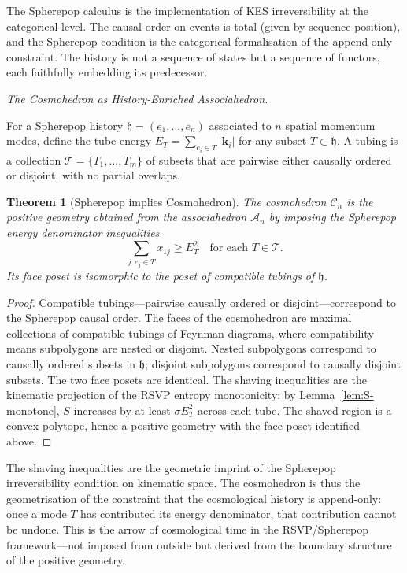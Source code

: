 \documentclass[11pt]{article}
\theoremstyle{plain}
\newtheorem{theorem}{Theorem}[section]
\theoremstyle{definition}
\theoremstyle{remark}
\newcommand{\Sf}{S}
\newcommand{\hist}{\mathfrak{h}}
\newcommand{\Assoc}{\mathcal{A}_n}
\newcommand{\Cosmo}{\mathcal{C}_n}
\begin{document}
The Spherepop calculus is the implementation of KES irreversibility at the categorical level. The causal order on events is total (given by sequence position), and the Spherepop condition is the categorical formalisation of the append-only constraint. The history is not a sequence of states but a sequence of functors, each faithfully embedding its predecessor.

\medskip\noindent\textit{The Cosmohedron as History-Enriched Associahedron.}

For a Spherepop history $\hist = (e_1, \ldots, e_n)$ associated to $n$ spatial momentum modes, define the tube energy $E_T = \sum_{e_i \in T} |\mathbf{k}_i|$ for any subset $T \subset \hist$. A tubing is a collection $\mathcal{T} = \{T_1, \ldots, T_m\}$ of subsets that are pairwise either causally ordered or disjoint, with no partial overlaps.

\begin{theorem}[Spherepop implies Cosmohedron]
\label{thm:cosmo}
The cosmohedron $\Cosmo$ is the positive geometry obtained from the associahedron $\Assoc$ by imposing the Spherepop energy denominator inequalities
\[
  \sum_{j: e_j \in T} x_{1j} \geq E_T^2 \quad \text{for each } T \in \mathcal{T}.
\]
Its face poset is isomorphic to the poset of compatible tubings of $\hist$.
\end{theorem}

\begin{proof}
Compatible tubings---pairwise causally ordered or disjoint---correspond to the Spherepop causal order. The faces of the cosmohedron are maximal collections of compatible tubings of Feynman diagrams, where compatibility means subpolygons are nested or disjoint. Nested subpolygons correspond to causally ordered subsets in $\hist$; disjoint subpolygons correspond to causally disjoint subsets. The two face posets are identical. The shaving inequalities are the kinematic projection of the RSVP entropy monotonicity: by Lemma~\ref{lem:S-monotone}, $\Sf$ increases by at least $\sigma E_T^2$ across each tube. The shaved region is a convex polytope, hence a positive geometry with the face poset identified above.
\end{proof}

The shaving inequalities are the geometric imprint of the Spherepop irreversibility condition on kinematic space. The cosmohedron is thus the geometrisation of the constraint that the cosmological history is append-only: once a mode $T$ has contributed its energy denominator, that contribution cannot be undone. This is the arrow of cosmological time in the RSVP/Spherepop framework---not imposed from outside but derived from the boundary structure of the positive geometry.
\end{document}
